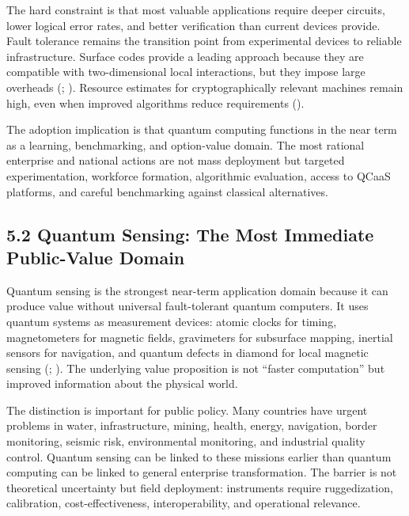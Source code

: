 \documentclass[
  11pt,
  letterpaper,
]{article}
\begin{document}
The hard constraint is that most valuable applications require deeper
circuits, lower logical error rates, and better verification than
current devices provide. Fault tolerance remains the transition point
from experimental devices to reliable infrastructure. Surface codes
provide a leading approach because they are compatible with
two-dimensional local interactions, but they impose large overheads
(;
).
Resource estimates for cryptographically relevant machines remain high,
even when improved algorithms reduce requirements
().

The adoption implication is that quantum computing functions in the near
term as a learning, benchmarking, and option-value domain. The most
rational enterprise and national actions are not mass deployment but
targeted experimentation, workforce formation, algorithmic evaluation,
access to QCaaS platforms, and careful benchmarking against classical
alternatives.

\subsection{5.2 Quantum Sensing: The Most Immediate Public-Value
Domain}\label{quantum-sensing-the-most-immediate-public-value-domain}

Quantum sensing is the strongest near-term application domain because it
can produce value without universal fault-tolerant quantum computers. It
uses quantum systems as measurement devices: atomic clocks for timing,
magnetometers for magnetic fields, gravimeters for subsurface mapping,
inertial sensors for navigation, and quantum defects in diamond for
local magnetic sensing (; ). The
underlying value proposition is not ``faster computation'' but improved
information about the physical world.

The distinction is important for public policy. Many countries have
urgent problems in water, infrastructure, mining, health, energy,
navigation, border monitoring, seismic risk, environmental monitoring,
and industrial quality control. Quantum sensing can be linked to these
missions earlier than quantum computing can be linked to general
enterprise transformation. The barrier is not theoretical uncertainty
but field deployment: instruments require ruggedization, calibration,
cost-effectiveness, interoperability, and operational relevance.
\end{document}
